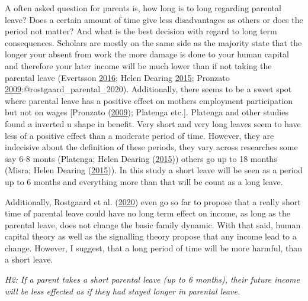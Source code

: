\documentclass[
  12pt,
]{article}
\begin{document}
A often asked question for parents is, how long is to long regarding parental leave? Does a certain amount of time give less disadvantages as others or does the period not matter? And what is the best decision with regard to long term consequences.
Scholars are mostly on the same side as the majority state that the longer your absent from work the more damage is done to your human capital and therefore your later income will be much lower than if not taking the parental leave (Evertsson \protect\hyperlink{ref-evertsson_parental_2016}{2016}; Helen Dearing \protect\hyperlink{ref-helen_dearing_does_2015}{2015}; Pronzato \protect\hyperlink{ref-pronzato_return_2009}{2009}:@rostgaard\_parental\_2020). Additionally, there seems to be a sweet spot where parental leave has a positive effect on mothers employment participation but not on wages {[}Pronzato (\protect\hyperlink{ref-pronzato_return_2009}{2009}); Platenga etc.{]}. Platenga and other studies found a inverted u shape in benefit. Very short and very long leaves seem to have less of a positive effect than a moderate period of time.
However, they are indecisive about the definition of these periods, they vary across researches some say 6-8 monts (Platenga; Helen Dearing (\protect\hyperlink{ref-helen_dearing_does_2015}{2015})) others go up to 18 months (Misra; Helen Dearing (\protect\hyperlink{ref-helen_dearing_does_2015}{2015})). In this study a short leave will be seen as a period up to 6 months and everything more than that will be count as a long leave.

Additionally, Rostgaard et al. (\protect\hyperlink{ref-rostgaard_parental_2020}{2020}) even go so far to propose that a really short time of parental leave could have no long term effect on income, as long as the parental leave, does not change the basic family dynamic. With that said, human capital theory as well as the signalling theory propose that any income lead to a change. However, I suggest, that a long period of time will be more harmful, than a short leave.

\emph{H2: If a parent takes a short parental leave (up to 6 months), their future income will be less effected as if they had stayed longer in parental leave.}
\end{document}
